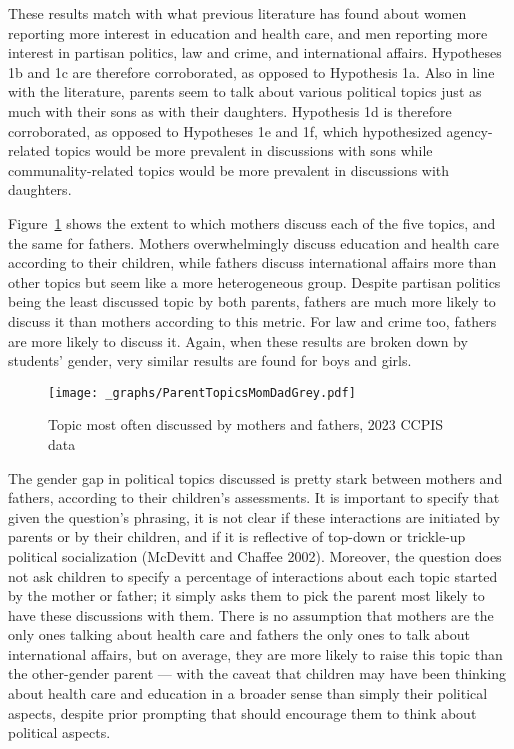 \documentclass[
  letterpaper,
  DIV=11,
  numbers=noendperiod]{scrreprt}
\begin{document}
These results match with what previous literature has found about women
reporting more interest in education and health care, and men reporting
more interest in partisan politics, law and crime, and international
affairs. Hypotheses 1b and 1c are therefore corroborated, as opposed to
Hypothesis 1a. Also in line with the literature, parents seem to talk
about various political topics just as much with their sons as with
their daughters. Hypothesis 1d is therefore corroborated, as opposed to
Hypotheses 1e and 1f, which hypothesized agency-related topics would be
more prevalent in discussions with sons while communality-related topics
would be more prevalent in discussions with daughters.

Figure~\ref{fig-parentsmomdad} shows the extent to which mothers discuss
each of the five topics, and the same for fathers. Mothers
overwhelmingly discuss education and health care according to their
children, while fathers discuss international affairs more than other
topics but seem like a more heterogeneous group. Despite partisan
politics being the least discussed topic by both parents, fathers are
much more likely to discuss it than mothers according to this metric.
For law and crime too, fathers are more likely to discuss it. Again,
when these results are broken down by students' gender, very similar
results are found for boys and girls.

\begin{figure}

{\centering \texttt{[image: \_graphs/ParentTopicsMomDadGrey.pdf]}

}

\caption{\label{fig-parentsmomdad}Topic most often discussed by mothers
and fathers, 2023 CCPIS data}

\end{figure}

The gender gap in political topics discussed is pretty stark between
mothers and fathers, according to their children's assessments. It is
important to specify that given the question's phrasing, it is not clear
if these interactions are initiated by parents or by their children, and
if it is reflective of top-down or trickle-up political socialization
(McDevitt and Chaffee 2002). Moreover, the question does not ask
children to specify a percentage of interactions about each topic
started by the mother or father; it simply asks them to pick the parent
most likely to have these discussions with them. There is no assumption
that mothers are the only ones talking about health care and fathers the
only ones to talk about international affairs, but on average, they are
more likely to raise this topic than the other-gender parent --- with
the caveat that children may have been thinking about health care and
education in a broader sense than simply their political aspects,
despite prior prompting that should encourage them to think about
political aspects.
\end{document}

